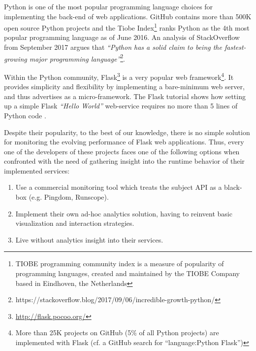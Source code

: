 Python is one of the most popular programming language choices for implementing the back-end of web applications. GitHub contains more than 500K open source Python projects and the Tiobe Index\footnote{TIOBE programming community index is a measure of popularity of programming languages, created and maintained by the TIOBE Company based in Eindhoven, the Netherlands} ranks Python as the 4th most popular programming language as of June 2016. An analysis of  StackOverflow from September 2017 argues that {\em ``Python has a solid claim to being the fastest-growing major programming language''}\footnote{https://stackoverflow.blog/2017/09/06/incredible-growth-python/}.
 
Within the Python community, Flask\footnote{\url{http://flask.pocoo.org/}} is a very popular web framework\footnote{More than 25K projects on GitHub (5\% of all Python projects) are implemented with Flask (cf. a GitHub search for ``language:Python Flask'')}. It provides simplicity and flexibility by implementing a bare-minimum web server, and thus advertises as a micro-framework. The Flask tutorial shows how setting up a simple Flask {\em ``Hello World''} web-service requires no more than 5 lines of Python code \cite{ flask:tutorial}.
 
Despite their popularity, to the best of our knowledge, there is no simple solution for monitoring the evolving performance of Flask web applications. Thus, every one of the developers of these projects faces one of the following options when confronted with the need of gathering insight into the runtime behavior of their implemented services: 

  \begin{enumerate}

    \item Use a commercial monitoring tool which treats the subject API as a black-box (e.g. Pingdom, Runscope). 

    \item Implement their own ad-hoc analytics solution, having to reinvent basic visualization and interaction strategies. 

    \item Live without analytics insight into their services.

  \end{enumerate}

